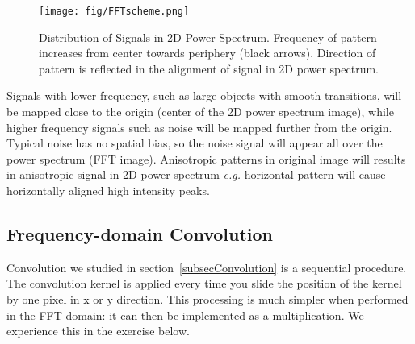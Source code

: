  \begin{figure}[H]
 \begin{center}
 \texttt{[image: fig/FFTscheme.png]}
 \caption{ Distribution of Signals in 2D Power Spectrum. Frequency of pattern increases from center towards periphery (black arrows). Direction of pattern is reflected in the alignment of signal in 2D power spectrum.}
 \label{fig:imgFFT}
 \end{center}
 \end{figure}

Signals with lower frequency, such as large objects with smooth transitions, will be mapped close to
the origin (center of the 2D power spectrum image), while higher frequency signals
such as noise will be mapped further from the origin. Typical noise has no spatial bias, so the noise signal will appear all over the power spectrum (FFT image). 
Anisotropic patterns in original image will results in anisotropic signal in 2D power spectrum \textit{e.g.} horizontal pattern will cause horizontally aligned high intensity peaks. 

\subsection{Frequency-domain Convolution}

Convolution we studied in section~\ref{subsecConvolution} is a sequential
procedure. The convolution kernel is applied every time you slide the position of
the kernel by one pixel in x or y direction. This processing is much simpler when performed in the FFT domain: it can then be implemented as a multiplication. We
experience this in the exercise below. 

